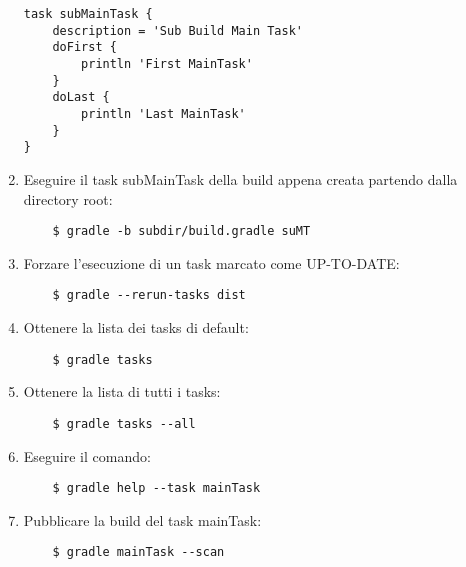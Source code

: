 \begin{enumerate}
\begin{lstlisting}[frame=single]
task subMainTask {
	description = 'Sub Build Main Task'
	doFirst {
		println 'First MainTask'
	}
	doLast {
		println 'Last MainTask'
	}
}
\end{lstlisting}
    \item Eseguire il task subMainTask della build appena creata partendo dalla directory root:
\begin{verbatim}
    $ gradle -b subdir/build.gradle suMT        
\end{verbatim}
    \item Forzare l'esecuzione di un task marcato come UP-TO-DATE:
\begin{verbatim}
    $ gradle --rerun-tasks dist
\end{verbatim}
    \item Ottenere la lista dei tasks di default:
\begin{verbatim}
    $ gradle tasks
\end{verbatim}
    \item Ottenere la lista di tutti i tasks:
\begin{verbatim}
    $ gradle tasks --all
\end{verbatim}
    \item Eseguire il comando:
\begin{verbatim}
    $ gradle help --task mainTask
\end{verbatim}
    \item Pubblicare la build del task mainTask:
\begin{verbatim}
    $ gradle mainTask --scan
\end{verbatim}
\end{enumerate}